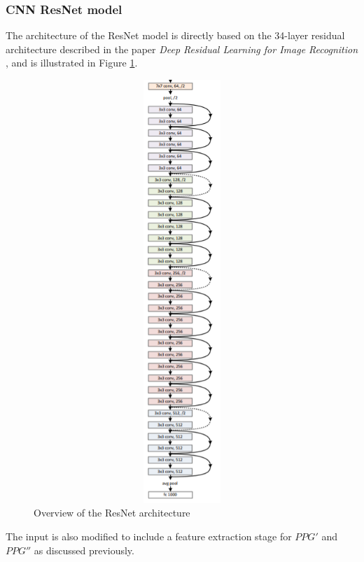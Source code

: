 \subsubsection{CNN ResNet model}
The architecture of the ResNet model is directly based on the 34-layer residual architecture described in the paper \emph{Deep Residual Learning for Image Recognition} \cite{resnetArch}, and is illustrated in Figure \ref{resnetArc}.
\begin{figure}[H]
    \centering
    \includegraphics[width=16cm,height=16cm,keepaspectratio]{Implementation/resnetArch.png}
    \caption{Overview of the ResNet architecture}
    \label{resnetArc}
\end{figure}\noindent The input is also modified to include a feature extraction stage for $PPG'$ and $PPG''$ as discussed previously.


